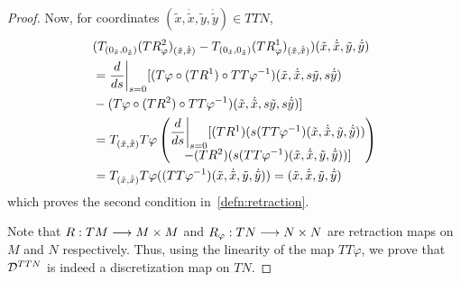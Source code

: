 \begin{prop}
\begin{proof}
        Now, for coordinates $(\tilde{x}, \dot{\tilde{x}}, \tilde{y}, \dot{\tilde{y}}) \in TTN$, 
        \begin{equation*}
            \begin{split}
                & (T_{(0_{\tilde{x}}, 0_{\dot{\tilde{x}}})}(TR^2_{\varphi})_{(\tilde{x}, \dot{\tilde{x}})} - T_{(0_{\tilde{x}}, 0_{\dot{\tilde{x}}})} (TR^1_{\varphi})_{(\tilde{x}, \dot{\tilde{x}})})(\tilde{x}, \dot{\tilde{x}}, \tilde{y}, \dot{\tilde{y}}) \\
                & = \dfrac{d}{ds} \bigg|_{s=0} [(T\varphi \circ (TR^1) \circ TT\varphi^{-1})(\tilde{x}, \dot{\tilde{x}}, s\tilde{y}, s\dot{\tilde{y}}) \\
                & - (T\varphi \circ (TR^2) \circ TT\varphi^{-1})(\tilde{x}, \dot{\tilde{x}}, s\tilde{y}, s\dot{\tilde{y}})] \\
                & = T_{(\tilde{x}, \dot{\tilde{x}})}T\varphi \begin{pmatrix} \dfrac{d}{ds} \bigg|_{s=0} [(TR^1)(s (TT\varphi^{-1})(\tilde{x},\dot{\tilde{x}}, \tilde{y}, \dot{\tilde{y}})) \\
                - (TR^2)(s (TT\varphi^{-1})(\tilde{x},\dot{\tilde{x}}, \tilde{y}, \dot{\tilde{y}}))]
                \end{pmatrix} \\
                & = T_{(\tilde{x}, \dot{\tilde{x}})}T\varphi((TT\varphi^{-1})(\tilde{x}, \dot{\tilde{x}}, \tilde{y}, \dot{\tilde{y}})) = (\tilde{x}, \dot{\tilde{x}}, \tilde{y}, \dot{\tilde{y}})
            \end{split}
        \end{equation*}
        which proves the second condition in~\eqref{defn:retraction}.

        Note that $R : TM \longrightarrow M \times M$ and $R_{\varphi} : TN \longrightarrow N \times N$ are retraction maps on $M$ and $N$ respectively.
        Thus, using the linearity of the map $TT\varphi$, we prove that $\mathcal{D}^{TTN}$ is indeed a discretization map on $TN$.
    \end{proof}
\end{prop}